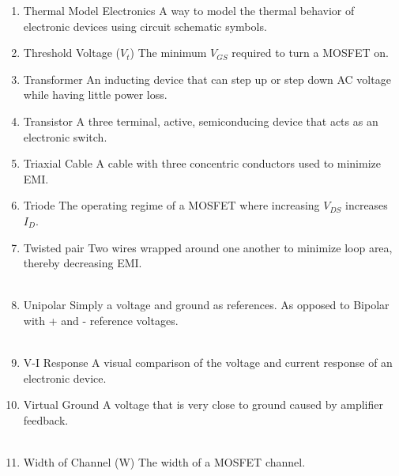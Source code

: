 \documentclass{IEEEtran}
\begin{document}
\begin{enumerate}
\\
\item Thermal Model Electronics
\subitem A way to model the thermal behavior of electronic devices using circuit schematic symbols.\\
\item Threshold Voltage ($V_t$)
\subitem The minimum $V_{GS}$ required to turn a MOSFET on. 
\item Transformer
\subitem An inducting device that can step up or step down AC voltage while having little power loss. \\
\item Transistor
  \subitem A three terminal, active, semiconducing device that acts as an electronic switch.\\
\item Triaxial Cable
  \subitem A cable with three concentric conductors used to minimize EMI. \\ 
\item Triode
  \subitem The operating regime of a MOSFET where increasing $V_{DS}$ increases $I_D$.\\
\item Twisted pair
\subitem Two wires wrapped around one another to minimize loop area, thereby decreasing EMI. \\

\\
\item Unipolar
  \subitem Simply a voltage and ground as references. As opposed to Bipolar with + and - reference voltages. \\ 

\\
\item V-I Response
  \subitem A visual comparison of the voltage and current response of an electronic device.\\
\item Virtual Ground
  \subitem A voltage that is very close to ground caused by amplifier feedback. \\

\\
\item Width of Channel (W)
  \subitem The width of a MOSFET channel.  
\\

\\
\\


\end{enumerate}
\end{document}
